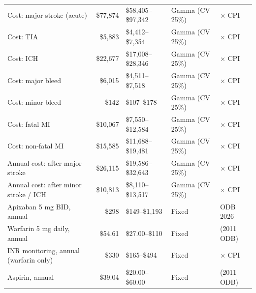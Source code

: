 \documentclass[11pt,letterpaper]{article}
\begin{document}
\begin{longtable}{@{}p{5.6cm}rp{2.7cm}p{3.1cm}l@{}}
Cost: major stroke (acute) & \$77,874 & \$58,405--\$97,342 & Gamma (CV 25\%) & \cite{cadthwe} $\times$ CPI \\
Cost: TIA & \$5,883 & \$4,412--\$7,354 & Gamma (CV 25\%) & \cite{cadthwe} $\times$ CPI \\
Cost: ICH & \$22,677 & \$17,008--\$28,346 & Gamma (CV 25\%) & \cite{cadthwe} $\times$ CPI \\
Cost: major bleed & \$6,015 & \$4,511--\$7,518 & Gamma (CV 25\%) & \cite{cadthwe} $\times$ CPI \\
Cost: minor bleed & \$142 & \$107--\$178 & Gamma (CV 25\%) & \cite{cadthwe} $\times$ CPI \\
Cost: fatal MI & \$10,067 & \$7,550--\$12,584 & Gamma (CV 25\%) & \cite{cadthwe} $\times$ CPI \\
Cost: non-fatal MI & \$15,585 & \$11,688--\$19,481 & Gamma (CV 25\%) & \cite{cadthwe} $\times$ CPI \\
Annual cost: after major stroke & \$26,115 & \$19,586--\$32,643 & Gamma (CV 25\%) & \cite{cadthwe} $\times$ CPI \\
Annual cost: after minor stroke / ICH & \$10,813 & \$8,110--\$13,517 & Gamma (CV 25\%) & \cite{cadthwe} $\times$ CPI \\
Apixaban 5 mg BID, annual & \$298 & \$149--\$1,193 & Fixed & ODB 2026 \\
Warfarin 5 mg daily, annual & \$54.61 & \$27.00--\$110 & Fixed & \cite{cadthwe} (2011 ODB) \\
INR monitoring, annual (warfarin only) & \$330 & \$165--\$494 & Fixed & \cite{cadthwe} $\times$ CPI \\
Aspirin, annual & \$39.04 & \$20.00--\$60.00 & Fixed & \cite{cadthwe} (2011 ODB) \\
\end{longtable}
\end{document}
